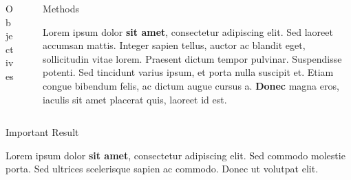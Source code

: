 \documentclass[final]{beamer}
\newlength{\sepwid}
\newlength{\onecolwid}
\newlength{\twocolwid}
\begin{document}
\begin{frame}
\begin{columns}[t]
\begin{column}{\twocolwid}
\begin{columns}[t,totalwidth=\twocolwid]
\begin{column}{\onecolwid}
\begin{exampleblock}{Objectives}
\end{exampleblock}


\end{column} %
\begin{column}{\sepwid}\end{column} %

\begin{column}{\onecolwid}\vspace{-.74in} %


\begin{exampleblock}{Methods}

Lorem ipsum dolor \textbf{sit amet}, consectetur adipiscing elit. Sed laoreet accumsan mattis. Integer sapien tellus, auctor ac blandit eget, sollicitudin vitae lorem. Praesent dictum tempor pulvinar. Suspendisse potenti. Sed tincidunt varius ipsum, et porta nulla suscipit et. Etiam congue bibendum felis, ac dictum augue cursus a. \textbf{Donec} magna eros, iaculis sit amet placerat quis, laoreet id est.

\end{exampleblock}


\end{column} %

\end{columns} %


\begin{alertblock}{Important Result}

Lorem ipsum dolor \textbf{sit amet}, consectetur adipiscing elit. Sed commodo molestie porta. Sed ultrices scelerisque sapien ac commodo. Donec ut volutpat elit.

\end{alertblock} 


\end{column}
\end{columns}
\end{frame}
\end{document}
